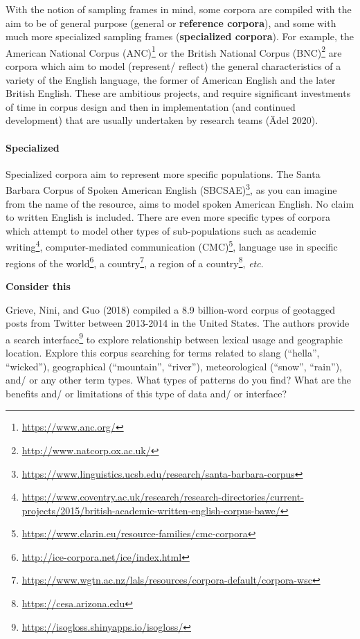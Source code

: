 \documentclass[
  letterpaper,
]{latex/krantz}
\let\oldparagraph\paragraph
\renewcommand{\paragraph}[1]{\oldparagraph{#1}\mbox{}}
\DeclareRobustCommand{\href}[2]{#2\footnote{\url{#1}}}
\begin{document}
With the notion of sampling frames in mind, some corpora are compiled
with the aim to be of general purpose (general or \textbf{reference
corpora}), and some with much more specialized sampling frames
(\textbf{specialized corpora}). For example, the
\href{https://www.anc.org/}{American National Corpus (ANC)} or the
\href{http://www.natcorp.ox.ac.uk/}{British National Corpus (BNC)} are
corpora which aim to model (represent/ reflect) the general
characteristics of a variety of the English language, the former of
American English and the later British English. These are ambitious
projects, and require significant investments of time in corpus design
and then in implementation (and continued development) that are usually
undertaken by research teams (Ädel 2020).

\hypertarget{specialized}{%
\paragraph{Specialized}\label{specialized}}

Specialized corpora aim to represent more specific populations. The
\href{https://www.linguistics.ucsb.edu/research/santa-barbara-corpus}{Santa
Barbara Corpus of Spoken American English (SBCSAE)}, as you can imagine
from the name of the resource, aims to model spoken American English. No
claim to written English is included. There are even more specific types
of corpora which attempt to model other types of sub-populations such as
\href{https://www.coventry.ac.uk/research/research-directories/current-projects/2015/british-academic-written-english-corpus-bawe/}{academic
writing},
\href{https://www.clarin.eu/resource-families/cmc-corpora}{computer-mediated
communication (CMC)}, language use in specific
\href{http://ice-corpora.net/ice/index.html}{regions of the world}, a
\href{https://www.wgtn.ac.nz/lals/resources/corpora-default/corpora-wsc}{country},
a \href{https://cesa.arizona.edu}{region of a country}, \emph{etc}.

\begin{tcolorbox}[enhanced jigsaw, arc=.35mm, leftrule=.75mm, rightrule=.15mm, opacityback=0, colback=white, breakable, bottomrule=.15mm, left=2mm, toprule=.15mm]

\textbf{ Consider this}

Grieve, Nini, and Guo (2018) compiled a 8.9 billion-word corpus of
geotagged posts from Twitter between 2013-2014 in the United States. The
authors provide a \href{https://isogloss.shinyapps.io/isogloss/}{search
interface} to explore relationship between lexical usage and geographic
location. Explore this corpus searching for terms related to slang
(``hella'', ``wicked''), geographical (``mountain'', ``river''),
meteorological (``snow'', ``rain''), and/ or any other term types. What
types of patterns do you find? What are the benefits and/ or limitations
of this type of data and/ or interface?

\end{tcolorbox}
\end{document}
